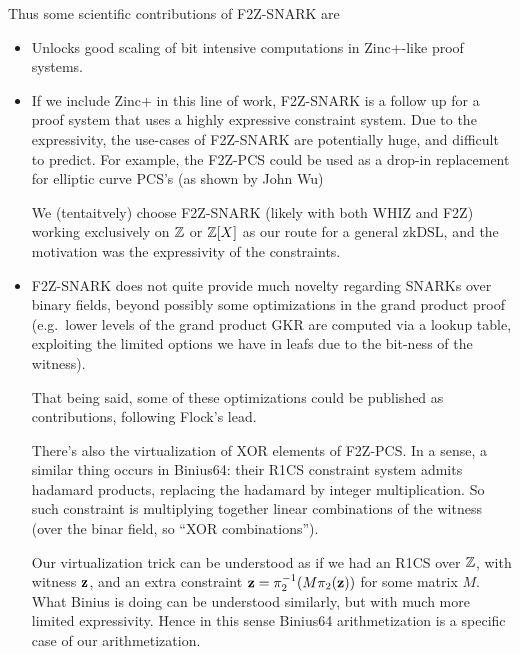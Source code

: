\documentclass[11pt,letterpaper,usenames,dvipsnames]{article}
\begin{document}
Thus some scientific contributions of F2Z-SNARK are
\begin{itemize}
    \item Unlocks good scaling of bit intensive computations in Zinc+-like proof systems.
    \item If we include Zinc+ in this line of work, F2Z-SNARK is a follow up for a proof system that uses a highly expressive constraint system. Due to the expressivity, the use-cases of F2Z-SNARK are potentially huge, and difficult to predict. For example, the F2Z-PCS could be used as a drop-in replacement for elliptic curve PCS's (as shown by John Wu)

    We (tentaitvely) choose F2Z-SNARK (likely with both WHIZ and F2Z) working exclusively on $\mathbb{Z}$ or $\mathbb{Z}[X]$ as our route for a general zkDSL, and the motivation was the expressivity of the constraints. 

    
    
    \item F2Z-SNARK does not quite provide much novelty regarding SNARKs over binary fields, beyond possibly some optimizations in the grand product proof  (e.g.\ lower levels of the grand product GKR are computed via a lookup table, exploiting the limited options we have in leafs due to the bit-ness of the witness). 

    That being said, some of these optimizations could be published as contributions, following Flock's lead. 

    There's also the virtualization of XOR elements of F2Z-PCS. In a sense, a similar thing occurs in Binius64: their R1CS constraint system admits hadamard products, replacing the hadamard by integer multiplication. So such constraint is multiplying together linear combinations of the witness (over the binar field, so ``XOR combinations''). 

    Our virtualization trick can be understood as if we had an R1CS over $\mathbb{Z}$, with witness $\mathbf{z}$, and an extra constraint $\mathbf{z}= \pi_2^{-1}(M\pi_2(\mathbf{z}))$ for some matrix $M$. What Binius is doing can be understood similarly, but with much more limited expressivity. Hence in this sense Binius64 arithmetization is a specific case of our arithmetization.
\end{itemize}



\end{document}
